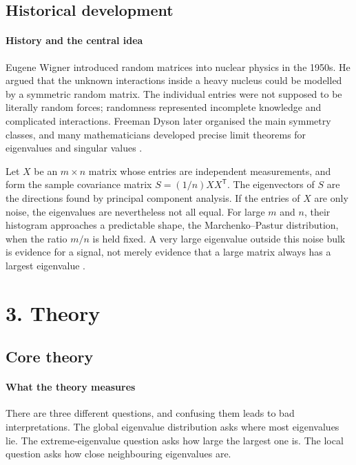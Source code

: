 \subsection*{Historical development}
\begin{historylist}
\paragraph{History and the central idea}
Eugene Wigner introduced random matrices into nuclear physics in the 1950s.
He argued that the unknown interactions inside a heavy nucleus could be
modelled by a symmetric random matrix.  The individual entries were not
supposed to be literally random forces; randomness represented incomplete
knowledge and complicated interactions.  Freeman Dyson later organised the
main symmetry classes, and many mathematicians developed precise limit
theorems for eigenvalues and singular values \cite{random_matrix_theory_ref1}.

Let $X$ be an $m\times n$ matrix whose entries are independent measurements,
and form the sample covariance matrix
$S=(1/n)XX^{\mathsf T}$.  The eigenvectors of $S$ are the directions found by
principal component analysis.  If the entries of $X$ are only noise, the
eigenvalues are nevertheless not all equal.  For large $m$ and $n$, their
histogram approaches a predictable shape, the Marchenko--Pastur distribution,
when the ratio $m/n$ is held fixed.  A very large eigenvalue outside this
noise bulk is evidence for a signal, not merely evidence that a large matrix
always has a largest eigenvalue \cite{random_matrix_theory_ref2}.

\end{historylist}
\section*{3. Theory}
\subsection*{Core theory}
\paragraph{What the theory measures}
There are three different questions, and confusing them leads to bad
interpretations.  The global eigenvalue distribution asks where most
eigenvalues lie.  The extreme-eigenvalue question asks how large the largest
one is.  The local question asks how close neighbouring eigenvalues are.

